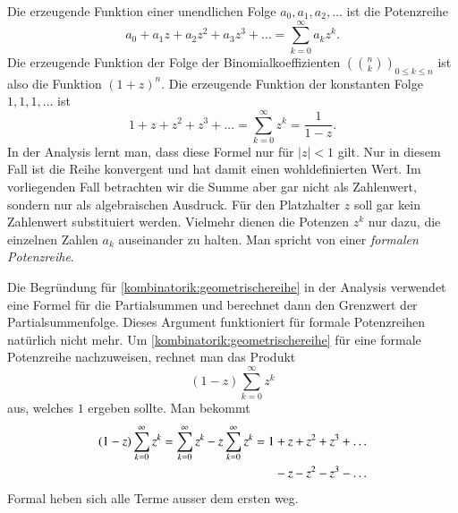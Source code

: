 Die erzeugende Funktion einer unendlichen Folge $a_0,a_1,a_2,\dots$ ist
die Potenzreihe
\[
a_0+a_1z+a_2z^2+a_3z^3+\dots=\sum_{k=0}^\infty a_kz^k.
\]
Die erzeugende Funktion der Folge der Binomialkoeffizienten
$\left(\binom{n}{k}\right)_{0\le k\le  n}$ ist also die Funktion $(1+z)^n$.
Die erzeugende Funktion der konstanten Folge $1,1,1,\dots$ ist
\begin{equation}
1+z+z^2+z^3+\dots=\sum_{k=0}^\infty z^k=\frac1{1-z}.
\label{kombinatorik:geometrischereihe}
\end{equation}
In der Analysis lernt man, dass diese Formel nur für $|z|<1$ gilt.
Nur in diesem Fall ist die Reihe konvergent und hat damit einen
wohldefinierten Wert.
Im vorliegenden Fall betrachten wir die Summe aber gar nicht als Zahlenwert,
sondern nur als algebraischen Ausdruck.
Für den Platzhalter $z$ soll gar kein Zahlenwert substituiert werden.
Vielmehr dienen die Potenzen $z^k$ nur dazu, die einzelnen Zahlen $a_k$
auseinander zu halten.
Man spricht von einer {\em formalen Potenzreihe}.

Die Begründung für \eqref{kombinatorik:geometrischereihe} in der 
Analysis verwendet eine Formel für die Partialsummen und berechnet
dann den Grenzwert der Partialsummenfolge.
Dieses Argument funktioniert für formale Potenzreihen natürlich nicht
mehr.
Um \eqref{kombinatorik:geometrischereihe} für eine formale Potenzreihe
nachzuweisen, rechnet man das Produkt
\[
(1-z)\sum_{k=0}^\infty z^k
\]
aus, welches $1$ ergeben sollte.
Man bekommt
\begin{align*}
(1-z)\sum_{k=0}^\infty z^k
=
\sum_{k=0}^\infty z^k - z\sum_{k=0}^\infty z^k
&=
1 + z + z^2 + z^3+\dots
\\
&\phantom{\mathstrut=1}
-z-z^2-z^3-\dots
\end{align*}
Formal heben sich alle Terme ausser dem ersten weg.

